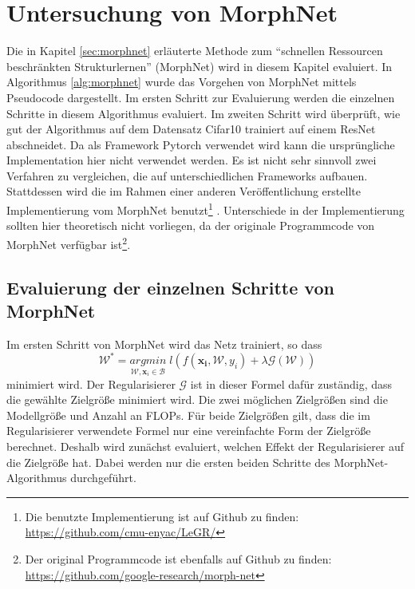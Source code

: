 \chapter{Untersuchung von MorphNet}\label{sec:morphexperimente}

Die in Kapitel \ref{sec:morphnet} erläuterte Methode zum ``schnellen Ressourcen beschränkten Strukturlernen'' (MorphNet) wird in diesem Kapitel evaluiert. In Algorithmus \ref{alg:morphnet} wurde das Vorgehen von MorphNet mittels Pseudocode dargestellt. Im ersten Schritt zur Evaluierung werden die einzelnen Schritte in diesem Algorithmus evaluiert. Im zweiten Schritt wird überprüft, wie gut der Algorithmus auf dem Datensatz Cifar10 trainiert auf einem ResNet abschneidet.
Da als Framework Pytorch verwendet wird kann die ursprüngliche Implementation hier nicht verwendet werden. Es ist nicht sehr sinnvoll zwei Verfahren zu vergleichen, die auf unterschiedlichen Frameworks aufbauen. Stattdessen wird die im Rahmen einer anderen Veröffentlichung erstellte Implementierung vom MorphNet benutzt\footnote{Die benutzte Implementierung ist auf Github zu finden: \url{https://github.com/cmu-enyac/LeGR/} } \cite{morphImple}. Unterschiede in der Implementierung sollten hier theoretisch nicht vorliegen, da der originale Programmcode von MorphNet verfügbar ist\footnote{Der original Programmcode ist ebenfalls auf Github zu finden: \url{https://github.com/google-research/morph-net}}.

\section{Evaluierung der einzelnen Schritte von MorphNet}
Im ersten Schritt von MorphNet wird das Netz trainiert, so dass
\begin{equation}
\mathcal{W}^{\ast}=\underset{\mathcal{W},\mathbf{x}_i \in \mathcal{B}}{arg min}\; l(f(\mathbf{x_i}, \mathcal{W},y_i) + \lambda \mathcal{G}(\mathcal{W}))
\end{equation}
minimiert wird. Der Regularisierer $\mathcal{G}$ ist in dieser Formel dafür zuständig, dass die gewählte Zielgröße minimiert wird. Die zwei möglichen Zielgrößen sind die Modellgröße und Anzahl an FLOPs. Für beide Zielgrößen gilt, dass die im Regularisierer verwendete Formel nur eine vereinfachte Form der Zielgröße berechnet. 
Deshalb wird zunächst evaluiert, welchen Effekt der Regularisierer auf die Zielgröße hat. Dabei werden nur die ersten beiden Schritte des MorphNet-Algorithmus durchgeführt.


